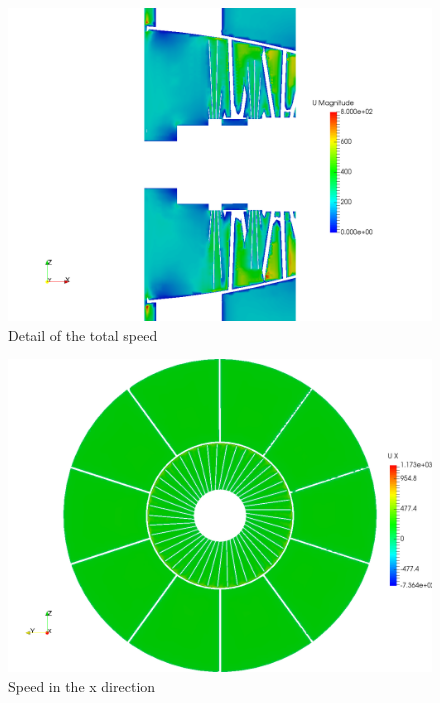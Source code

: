 \begin{figure}[h!]
\centering
\includegraphics[scale=0.3]{./img/screenshoots/U2bis.png}
\caption{Detail of the total speed}
\label{u2bis}
\end{figure}


\newpage{}

\begin{figure}[h!]
\centering
\includegraphics[scale=0.28]{./img/screenshoots/Ux1.png}
\caption{Speed in the x direction}
\label{ux1}
\end{figure}

